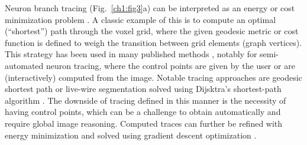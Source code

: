 Neuron branch tracing (Fig.~\ref{ch1:fig3}a) can be interpreted as an energy or cost minimization problem \cite{meijering2004design, peng2010automatic}. A classic example of this is to compute an optimal (``shortest'') path through the voxel grid, where the given geodesic metric or cost function is defined to weigh the transition between grid elements (graph vertices). This strategy has been used in many published methods \cite{meijering2004design, peng2010v3d, longair2011simple}, notably for semi-automated neuron tracing, where the control points are given by the user or are (interactively) computed from the image. Notable tracing approaches are geodesic shortest path \cite{peng2010automatic} or live-wire segmentation \cite{meijering2004design} solved using Dijsktra's shortest-path algorithm \cite{dijkstra1959note}. The downside of tracing defined in this manner is the necessity of having control points, which can be a challenge to obtain automatically and require global image reasoning. Computed traces can further be refined with energy minimization and solved using gradient descent optimization \cite{peng2007straightening,peng2010automatic}.

